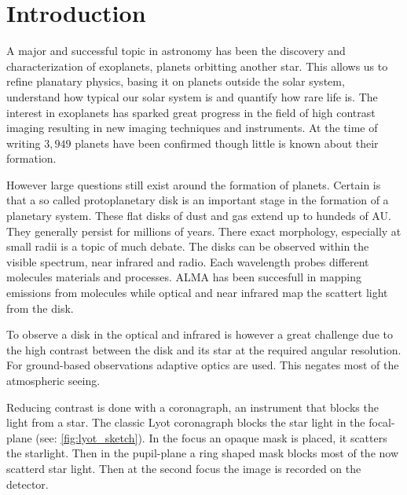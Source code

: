 
\chapter{Introduction} %

\label{ch:intro} %


A major and successful topic in astronomy has been the discovery and characterization of exoplanets, planets orbitting another star. This allows us to refine planatary physics, basing it on planets outside the solar system, understand how typical our solar system is and quantify how rare life is. The interest in exoplanets has sparked great progress in the field of high contrast imaging resulting in new imaging techniques and instruments. At the time of writing $3,949$ planets have been confirmed though little is known about their formation. 

However large questions still exist around the formation of planets. Certain is that a so called protoplanetary disk is an important stage in the formation of a planetary system. These flat disks of dust and gas extend up to hundeds of AU. They generally persist for millions of years. There exact morphology, especially at small radii is a topic of much debate. The disks can be observed within the visible spectrum, near infrared and radio. Each wavelength probes different molecules materials and processes. ALMA has been succesfull in mapping emissions from molecules while optical and near infrared map the scattert light from the disk.

To observe a disk in the optical and infrared is however a great challenge due to the high contrast between the disk and its star at the required angular resolution. For ground-based observations adaptive optics are used. This negates most of the atmospheric seeing.

Reducing contrast is done with a coronagraph, an instrument that blocks the light from a star. The classic Lyot coronagraph blocks the star light in the focal-plane (see: \autoref{fig:lyot_sketch}). In the focus an opaque mask is placed, it scatters the starlight. Then in the pupil-plane a ring shaped mask blocks most of the now scatterd star light. Then at the second focus the image is recorded on the detector.

